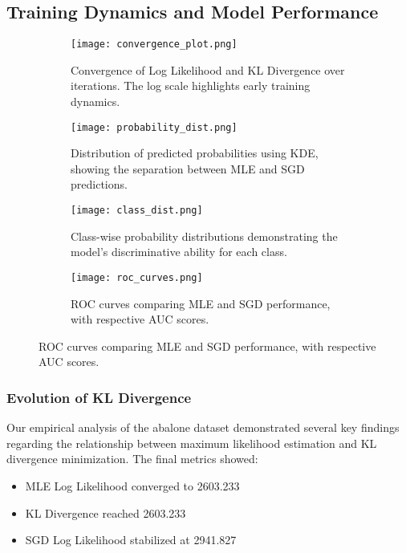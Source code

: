 \documentclass[preprint,12pt]{elsarticle}
\begin{document}
\subsection{Training Dynamics and Model Performance}
\begin{figure}[htbp]
    \centering
    \begin{subfigure}[b]{0.48\textwidth}
        \centering
        \texttt{[image: convergence\_plot.png]}
        \caption{Convergence of Log Likelihood and KL Divergence over iterations. The log scale highlights early training dynamics.}
        \label{fig:convergence}
    \end{subfigure}
    \hfill
    \begin{subfigure}[b]{0.48\textwidth}
        \centering
        \texttt{[image: probability\_dist.png]}
        \caption{Distribution of predicted probabilities using KDE, showing the separation between MLE and SGD predictions.}
        \label{fig:prob_dist}
    \end{subfigure}
    \vspace{0.5cm}
    
    \begin{subfigure}[b]{0.48\textwidth}
        \centering
        \texttt{[image: class\_dist.png]}
        \caption{Class-wise probability distributions demonstrating the model's discriminative ability for each class.}
        \label{fig:class_dist}
    \end{subfigure}
    \hfill
    \begin{subfigure}[b]{0.48\textwidth}
        \centering
        \texttt{[image: roc\_curves.png]}
        \caption{ROC curves comparing MLE and SGD performance, with respective AUC scores.}
        \label{fig:roc}
    \end{subfigure}
    \label{fig:all_plots}
\end{figure}

\subsubsection{Evolution of KL Divergence}
Our empirical analysis of the abalone dataset demonstrated several key findings regarding the relationship between maximum likelihood estimation and KL divergence minimization. The final metrics showed:
\begin{itemize}
    \item MLE Log Likelihood converged to 2603.233
    \item KL Divergence reached 2603.233
    \item SGD Log Likelihood stabilized at 2941.827
\end{itemize}
\end{document}

